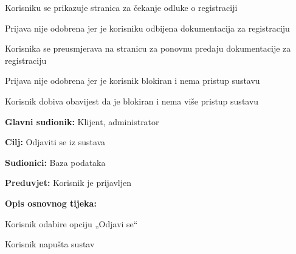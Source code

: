 \begin{packed_item}
\begin{packed_item}
\begin{packed_enum}
									\item Korisniku se prikazuje stranica za čekanje odluke o registraciji
								\end{packed_enum}
								\item[4.b] Prijava nije odobrena jer je korisniku odbijena dokumentacija za registraciju
								\item[] \begin{packed_enum}
									\item Korisnika se preusmjerava na stranicu za ponovnu predaju dokumentacije za registraciju
								\end{packed_enum}
								\item[4.c] Prijava nije odobrena jer je korisnik blokiran i nema pristup sustavu
								\item[] \begin{packed_enum}
									\item Korisnik dobiva obavijest da je blokiran i nema više pristup sustavu
								\end{packed_enum}
								
								
								
							\end{packed_item}
						\end{packed_item}
						\noindent {}
						\begin{packed_item}
							
							\item \textbf{Glavni sudionik: } Klijent, administrator
							\item  \textbf{Cilj: } Odjaviti se iz sustava
							\item  \textbf{Sudionici: }Baza podataka
							\item  \textbf{Preduvjet: }Korisnik je prijavljen
							\item  \textbf{Opis osnovnog tijeka:}
							
							\item[] \begin{packed_enum}
								
								\item 	Korisnik odabire opciju „Odjavi se“
								\item 	Korisnik napušta sustav
								
								
							\end{packed_enum}
						\end{packed_item}
						\noindent {}
